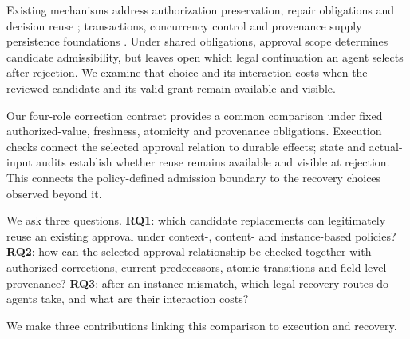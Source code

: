 \documentclass[pdflatex,sn-basic]{sn-jnl}
\begin{document}
Existing mechanisms address authorization preservation, repair obligations and decision reuse \citep{zhu2026resa,bindschaedler2026guarded}; transactions, concurrency control and provenance supply persistence foundations \citep{gray-transaction,kung-occ,buneman-provenance}. Under shared obligations, approval scope determines candidate admissibility, but leaves open which legal continuation an agent selects after rejection. We examine that choice and its interaction costs when the reviewed candidate and its valid grant remain available and visible.

Our four-role correction contract provides a common comparison under fixed authorized-value, freshness, atomicity and provenance obligations. Execution checks connect the selected approval relation to durable effects; state and actual-input audits establish whether reuse remains available and visible at rejection. This connects the policy-defined admission boundary to the recovery choices observed beyond it.

We ask three questions. \textbf{RQ1}: which candidate replacements can legitimately reuse an existing approval under context-, content- and instance-based policies? \textbf{RQ2}: how can the selected approval relationship be checked together with authorized corrections, current predecessors, atomic transitions and field-level provenance? \textbf{RQ3}: after an instance mismatch, which legal recovery routes do agents take, and what are their interaction costs?

We make three contributions linking this comparison to execution and recovery.
\end{document}
